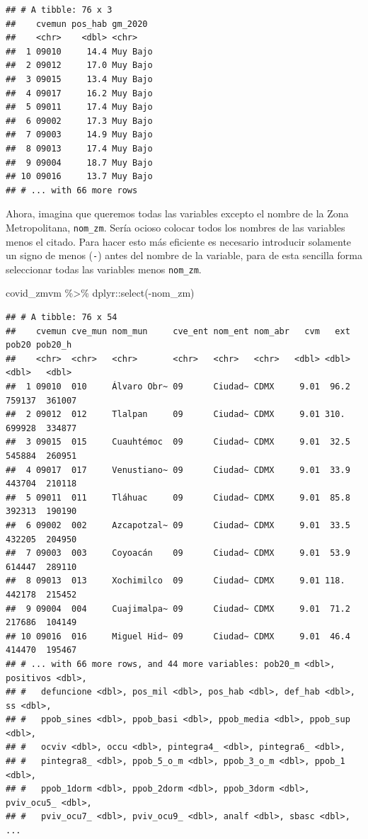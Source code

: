 \documentclass[
  11pt,
  oneside]{book}
\newenvironment{Shaded}{\begin{snugshade}}{\end{snugshade}}
\newcommand{\FunctionTok}[1]{\textcolor[rgb]{0.00,0.00,0.00}{#1}}
\newcommand{\NormalTok}[1]{#1}
\newcommand{\SpecialCharTok}[1]{\textcolor[rgb]{0.00,0.00,0.00}{#1}}
\begin{document}
\begin{verbatim}
## # A tibble: 76 x 3
##    cvemun pos_hab gm_2020 
##    <chr>    <dbl> <chr>   
##  1 09010     14.4 Muy Bajo
##  2 09012     17.0 Muy Bajo
##  3 09015     13.4 Muy Bajo
##  4 09017     16.2 Muy Bajo
##  5 09011     17.4 Muy Bajo
##  6 09002     17.3 Muy Bajo
##  7 09003     14.9 Muy Bajo
##  8 09013     17.4 Muy Bajo
##  9 09004     18.7 Muy Bajo
## 10 09016     13.7 Muy Bajo
## # ... with 66 more rows
\end{verbatim}

Ahora, imagina que queremos todas las variables excepto el nombre de la Zona Metropolitana, \texttt{nom\_zm}. Sería ocioso colocar todos los nombres de las variables menos el citado. Para hacer esto más eficiente es necesario introducir solamente un signo de menos (\texttt{-}) antes del nombre de la variable, para de esta sencilla forma seleccionar todas las variables menos \texttt{nom\_zm}.

\begin{Shaded}
\begin{Highlighting}[]
\NormalTok{covid\_zmvm }\SpecialCharTok{\%\textgreater{}\%}\NormalTok{ dplyr}\SpecialCharTok{::}\FunctionTok{select}\NormalTok{(}\SpecialCharTok{{-}}\NormalTok{nom\_zm)}
\end{Highlighting}
\end{Shaded}

\begin{verbatim}
## # A tibble: 76 x 54
##    cvemun cve_mun nom_mun     cve_ent nom_ent nom_abr   cvm   ext  pob20 pob20_h
##    <chr>  <chr>   <chr>       <chr>   <chr>   <chr>   <dbl> <dbl>  <dbl>   <dbl>
##  1 09010  010     Álvaro Obr~ 09      Ciudad~ CDMX     9.01  96.2 759137  361007
##  2 09012  012     Tlalpan     09      Ciudad~ CDMX     9.01 310.  699928  334877
##  3 09015  015     Cuauhtémoc  09      Ciudad~ CDMX     9.01  32.5 545884  260951
##  4 09017  017     Venustiano~ 09      Ciudad~ CDMX     9.01  33.9 443704  210118
##  5 09011  011     Tláhuac     09      Ciudad~ CDMX     9.01  85.8 392313  190190
##  6 09002  002     Azcapotzal~ 09      Ciudad~ CDMX     9.01  33.5 432205  204950
##  7 09003  003     Coyoacán    09      Ciudad~ CDMX     9.01  53.9 614447  289110
##  8 09013  013     Xochimilco  09      Ciudad~ CDMX     9.01 118.  442178  215452
##  9 09004  004     Cuajimalpa~ 09      Ciudad~ CDMX     9.01  71.2 217686  104149
## 10 09016  016     Miguel Hid~ 09      Ciudad~ CDMX     9.01  46.4 414470  195467
## # ... with 66 more rows, and 44 more variables: pob20_m <dbl>, positivos <dbl>,
## #   defuncione <dbl>, pos_mil <dbl>, pos_hab <dbl>, def_hab <dbl>, ss <dbl>,
## #   ppob_sines <dbl>, ppob_basi <dbl>, ppob_media <dbl>, ppob_sup <dbl>,
## #   ocviv <dbl>, occu <dbl>, pintegra4_ <dbl>, pintegra6_ <dbl>,
## #   pintegra8_ <dbl>, ppob_5_o_m <dbl>, ppob_3_o_m <dbl>, ppob_1 <dbl>,
## #   ppob_1dorm <dbl>, ppob_2dorm <dbl>, ppob_3dorm <dbl>, pviv_ocu5_ <dbl>,
## #   pviv_ocu7_ <dbl>, pviv_ocu9_ <dbl>, analf <dbl>, sbasc <dbl>, ...
\end{verbatim}
\end{document}
